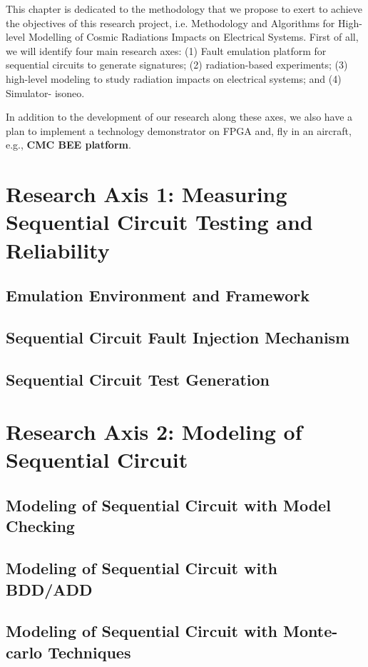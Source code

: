 \label{sec:approach}

This chapter is dedicated to the methodology that we propose to exert to achieve the objectives of this research project, i.e. Methodology and Algorithms for High-level Modelling of Cosmic Radiations Impacts on Electrical Systems. First of all, we will identify four main research axes: (1)  Fault emulation platform for sequential circuits to generate signatures; (2) radiation-based experiments; (3) high-level modeling to study radiation impacts on electrical systems; and (4) Simulator- isoneo.

In addition to the development of our research along these axes, we also have a plan to implement a technology demonstrator on FPGA and, fly in an aircraft, e.g., \textbf{CMC BEE platform}.

\section{Research Axis 1: Measuring Sequential Circuit Testing and Reliability}

\subsection{Emulation Environment and Framework}
\subsection{Sequential Circuit Fault Injection Mechanism}
\subsection{Sequential Circuit Test Generation}


\section{Research Axis 2: Modeling of Sequential Circuit}
\subsection{Modeling of Sequential Circuit with Model Checking}

\subsection{Modeling of Sequential Circuit with BDD/ADD}

\subsection{Modeling of Sequential Circuit with Monte-carlo Techniques}

